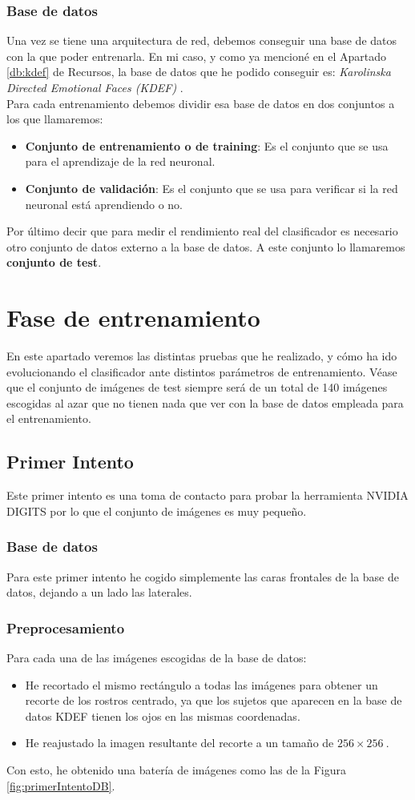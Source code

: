 \documentclass[a4paper,11pt]{book}
\begin{document}
\subsubsection{Base de datos}
Una vez se tiene una arquitectura de red, debemos conseguir una base de datos con la que poder entrenarla. En mi caso, y como ya mencioné en el Apartado \ref{db:kdef} de Recursos, la base de datos que he podido conseguir es: \textit{Karolinska Directed Emotional Faces (KDEF)} \cite{kdef98}.\\
Para cada entrenamiento debemos dividir esa base de datos en dos conjuntos a los que llamaremos:
\begin{itemize}
	\item \textbf{Conjunto de entrenamiento o de training}: Es el conjunto que se usa para el aprendizaje de la red neuronal. 
	\item \textbf{Conjunto de validación}: Es el conjunto que se usa para verificar si la red neuronal está aprendiendo o no.
\end{itemize}
Por último decir que para medir el rendimiento real del clasificador es necesario otro conjunto de datos externo a la base de datos. A este conjunto lo llamaremos \textbf{conjunto de test}.

\section{Fase de entrenamiento}
En este apartado veremos las distintas pruebas que he realizado, y cómo ha ido evolucionando el clasificador ante distintos parámetros de entrenamiento. Véase que el conjunto de imágenes de test siempre será de un total de 140 imágenes escogidas al azar que no tienen nada que ver con la base de datos empleada para el entrenamiento.
\subsection{Primer Intento}\label{sub:entrenamiento1}
Este primer intento es una toma de contacto para probar la herramienta NVIDIA DIGITS por lo que el conjunto de imágenes es muy pequeño.
\subsubsection{Base de datos}
Para este primer intento he cogido simplemente las caras frontales de la base de datos, dejando a un lado las laterales.

\subsubsection{Preprocesamiento}
Para cada una de las imágenes escogidas de la base de datos:
\begin{itemize}
	\item He recortado el mismo rectángulo a todas las imágenes para obtener un recorte de los rostros centrado, ya que los sujetos que aparecen en la base de datos KDEF tienen los ojos en las mismas coordenadas.
	\item He reajustado la imagen resultante del recorte a un tamaño de \(256\times256\ \).
\end{itemize}
Con esto, he obtenido una batería de imágenes como las de la Figura \ref{fig:primerIntentoDB}.
\end{document}
